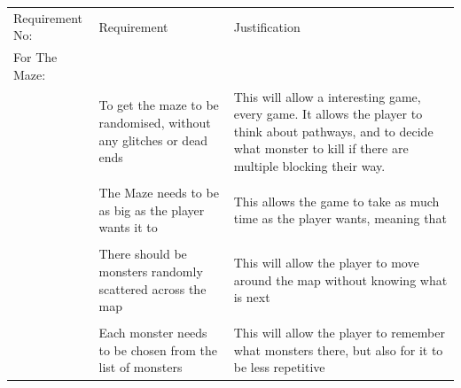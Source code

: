 \documentclass[12pt]{article}
\begin{document}
\begin{tabularx}{\linewidth}{XXX}
Requirement No:         & Requirement                                                                                        & Justification                                                                                                                                                                                                                                      \\
For The Maze:           &                                                                                                    &                                                                                                                                                                                                                                                    \\
                        & To get the maze to be randomised, without any glitches or dead ends                                & This will allow a interesting game, every game. It allows the player to think about pathways, and to decide what monster to kill if there are multiple blocking their way.  
                        \\ 
                        \\                                                                      
                        & The Maze needs to be as big as the player wants it to                                              & This allows the game to take as much time as the player wants, meaning that                                                                                                                                                                       
                        \\
                         \\
                        & There should be monsters randomly scattered across the map                                         & This will allow the player to move around the map without knowing what is next                                                                                                                                                                    
                        \\
		     \\
                        & Each monster needs to be chosen from the list of monsters                                          & This will allow the player to remember what monsters there, but also for it to be less repetitive                                                                                                                                                  		     \\

\end{tabularx}
\end{document}

